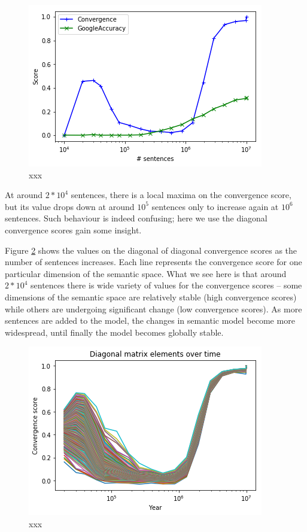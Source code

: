 \documentclass{article} %
\begin{document}
\begin{figure}
 \includegraphics[scale=1]{figure1.png} 
 \caption{xxx}
 \label{fig:1}
\end{figure}

At around $2 * 10^4$ sentences, there is a local maxima on the convergence score, but its value drops down at around $10^5$ sentences only to increase again at $10^6$ sentences. Such behaviour is indeed confusing; here we use the diagonal convergence scores gain some insight.

Figure \ref{fig:2} shows the values on the diagonal of diagonal convergence scores as the number of sentences increases. Each line represents the convergence score for one particular dimension of the semantic space. What we see here is that around $2 * 10^4$ sentences there is wide variety of values for the convergence scores -- some dimensions of the semantic space are relatively stable (high convergence scores) while others are undergoing significant change (low convergence scores). As more sentences are added to the model, the changes in semantic model become more widespread, until finally the model becomes globally stable.

\begin{figure}
 \includegraphics[scale=1]{figure2.png} 
 \caption{xxx}
 \label{fig:2}
\end{figure}
\end{document}
